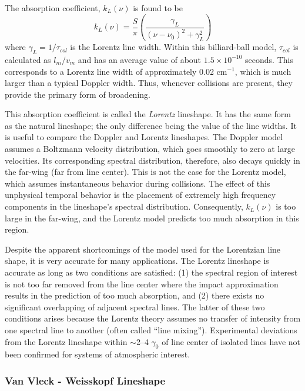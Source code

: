 \documentclass[11pt]{article}
\begin{document}
The absorption coefficient, $k_{L}(\nu)$ is found to be
\begin{equation}
 k_{L}(\nu)=\frac{S}{\pi}\left(\frac{\gamma_{L}}
{(\nu-\nu_{0})^{2}+\gamma_{L}^{2}}\right)
\end{equation}
where $\gamma_{L}=1/\tau_{col}$ is the Lorentz line width.  Within this
billiard-ball model, $\tau_{col}$ is calculated as $l_{m}/v_{m}$ and has 
an average value of about $1.5 \times 10^{-10}$ seconds\cite{bre:56}.
This corresponds to a Lorentz line width of approximately 0.02 cm$^{-1}$, 
which is much larger than a typical Doppler width.  Thus, whenever 
collisions are present, they provide the primary form of broadening.  

This absorption coefficient is called the {\it Lorentz} 
lineshape.  It has the same form as the natural lineshape; the only
difference being the value of the line widths.  It is useful to compare 
the Doppler and Lorentz lineshapes.  The Doppler model assumes a Boltzmann 
velocity distribution, which goes smoothly to zero at large velocities.  Its
corresponding spectral distribution, therefore, also decays quickly in the 
far-wing (far from line center).  This is not the case for the Lorentz
model, which assumes instantaneous behavior during collisions.  The effect
of this unphysical temporal behavior is the placement of extremely high
frequency components in the lineshape's spectral distribution.
Consequently, $k_{L}(\nu)$ is too large in the far-wing, and the Lorentz
model predicts too much absorption in this region.

Despite the apparent shortcomings of the model used for the Lorentzian line
shape, it is very accurate for many applications.  The Lorentz lineshape is
accurate as long as two conditions are satisfied: (1) the spectral
region of interest is not too far removed from the line center where the 
impact approximation results in the prediction of too much absorption, and 
(2) there exists no significant overlapping of adjacent 
spectral lines.  The latter of these
two conditions arises because the Lorentz theory assumes no transfer of
intensity from one spectral line to another (often called ``line mixing'').
Experimental deviations from the Lorentz lineshape within $\sim$2--4
$\gamma_0$ of line center of isolated lines have not been confirmed for
systems of atmospheric interest.

\subsubsection{Van Vleck - Weisskopf Lineshape}\label{sec:vvw}
\end{document}
